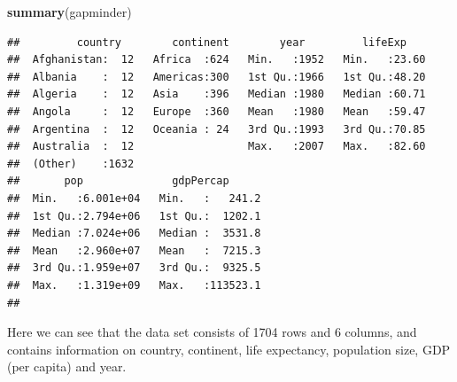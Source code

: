\documentclass[]{book}
\newenvironment{Shaded}{\begin{snugshade}}{\end{snugshade}}
\newcommand{\KeywordTok}[1]{\textcolor[rgb]{0.13,0.29,0.53}{\textbf{{#1}}}}
\newcommand{\NormalTok}[1]{{#1}}
\theoremstyle{definition}
\theoremstyle{definition}
\theoremstyle{definition}
\theoremstyle{remark}
\begin{document}
\begin{Shaded}
\begin{Highlighting}[]
\KeywordTok{summary}\NormalTok{(gapminder)}
\end{Highlighting}
\end{Shaded}

\begin{verbatim}
##         country        continent        year         lifeExp     
##  Afghanistan:  12   Africa  :624   Min.   :1952   Min.   :23.60  
##  Albania    :  12   Americas:300   1st Qu.:1966   1st Qu.:48.20  
##  Algeria    :  12   Asia    :396   Median :1980   Median :60.71  
##  Angola     :  12   Europe  :360   Mean   :1980   Mean   :59.47  
##  Argentina  :  12   Oceania : 24   3rd Qu.:1993   3rd Qu.:70.85  
##  Australia  :  12                  Max.   :2007   Max.   :82.60  
##  (Other)    :1632                                                
##       pop              gdpPercap       
##  Min.   :6.001e+04   Min.   :   241.2  
##  1st Qu.:2.794e+06   1st Qu.:  1202.1  
##  Median :7.024e+06   Median :  3531.8  
##  Mean   :2.960e+07   Mean   :  7215.3  
##  3rd Qu.:1.959e+07   3rd Qu.:  9325.5  
##  Max.   :1.319e+09   Max.   :113523.1  
## 
\end{verbatim}

Here we can see that the data set consists of 1704 rows and 6 columns,
and contains information on country, continent, life expectancy,
population size, GDP (per capita) and year.
\end{document}

